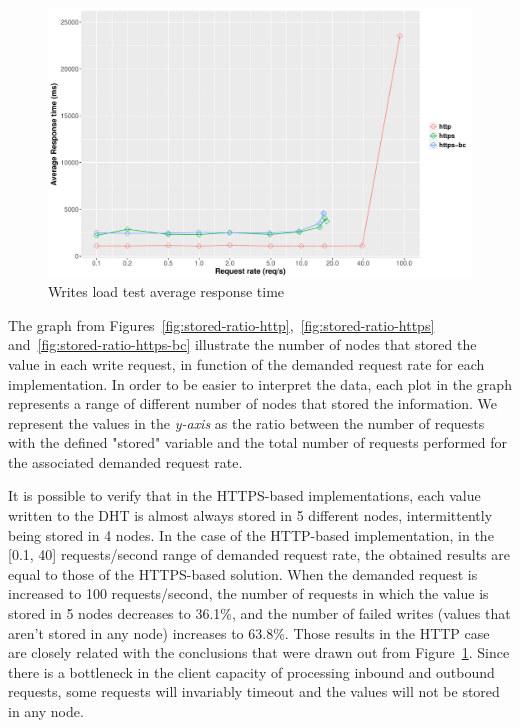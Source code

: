 \begin{figure}[h!]
  \centering
  \includegraphics[scale=0.4]{Figures/evaluation/average-response-time.pdf}
  \caption{Writes load test average response time}
  \label{fig:average-response-time}
\end{figure}


The graph from Figures~\ref{fig:stored-ratio-http},~\ref{fig:stored-ratio-https} and~\ref{fig:stored-ratio-https-bc} illustrate the number of nodes that stored the value in each write request, in function of the demanded request rate for each implementation.
In order to be easier to interpret the data, each plot in the graph represents a range of different number of nodes that stored the information.
We represent the values in the \textit{y-axis} as the ratio between the number of requests with the defined "stored" variable and the total number of requests performed for the associated demanded request rate.

It is possible to verify that in the HTTPS-based implementations, each value written to the DHT is almost always stored in 5 different nodes, intermittently being stored in 4 nodes.
In the case of the HTTP-based implementation, in the [0.1, 40] requests/second range of demanded request rate, the obtained results are equal to those of the HTTPS-based solution.
When the demanded request is increased to 100 requests/second, the number of requests in which the value is stored in 5 nodes decreases to 36.1\%, and the number of failed writes (values that aren't stored in any node) increases to 63.8\%.
Those results in the HTTP case are closely related with the conclusions that were drawn out from Figure~\ref{fig:average-response-time}.
Since there is a bottleneck in the client capacity of processing inbound and outbound requests, some requests will invariably timeout and the values will not be stored in any node.

